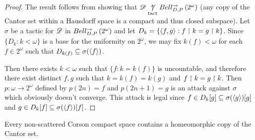 \documentclass[11pt]{article}
\begin{document}
  \begin{proof}
    The result follows from showing that
    $\mathscr{D}\underset{\text{tact}}{\not\uparrow}Bell_{D,P}^{\to}\left({2^\omega}\right)$ (any copy of the Cantor
    set within a Hausdorff space is a compact and thus closed subspace).
    Let $\sigma$ be a tactic for $\mathscr{D}$ in $Bell_{D,P}^{\to}\left({2^\omega}\right)$
    and let $D_k=\{\langle f,g\rangle:f\restriction k = g\restriction k\}$. Since $\{D_k:k<\omega\}$
    is a base for the uniformity on $2^\omega$, we may fix $k(f)<\omega$
    for each $f\in2^\omega$ such that $D_{k(f)}\subseteq\sigma(\langle f\rangle)$.

    Then there exists $k<\omega$ such that $\{f:k=k(f)\}$ is uncountable,
    and therefore there exist distinct $f,g$ such that $k=k(f)=k(g)$ and
    $f\restriction k=g\restriction k$. Then $p:\omega\to2^\omega$ defined by
    $p(2n)=f$ and $p(2n+1)=g$ is an attack against $\sigma$ which
    obviously doesn't converge. This attack is legal since
    $f\in D_k[g]\subseteq\sigma(\langle g\rangle)[g]$ and
    $g\in D_k[f]\subseteq\sigma(\langle f\rangle)[f]$.
  \end{proof}

  \begin{lemma}
    Every non-scattered Corson compact space contains a homeomorphic
    copy of the Cantor set.
  \end{lemma}
\end{document}
